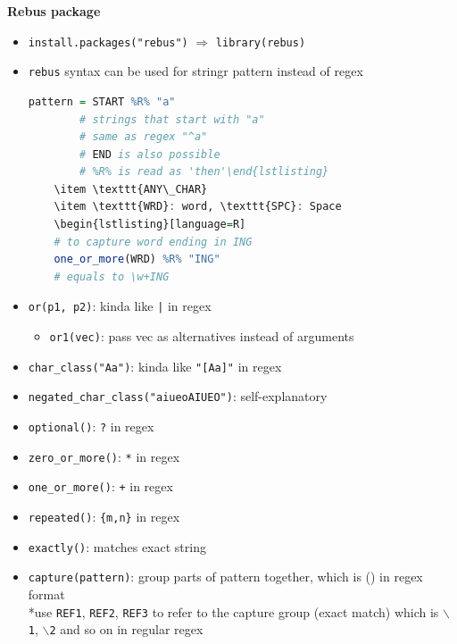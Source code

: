 \documentclass{article}
\begin{document}
\begin{multicols}{2}
\textbf{Rebus package}
\begin{itemize}
	\item \texttt{install.packages("rebus")} $\Rightarrow$ \texttt{library(rebus)}
	\item \texttt{rebus} syntax can be used for stringr pattern instead of regex
	\begin{lstlisting}[language =R]
		pattern = START %R% "a"
		# strings that start with "a"
		# same as regex "^a"
		# END is also possible
		# %R% is read as 'then'\end{lstlisting}
	\item \texttt{ANY\_CHAR}
	\item \texttt{WRD}: word, \texttt{SPC}: Space
	\begin{lstlisting}[language=R]
	# to capture word ending in ING
	one_or_more(WRD) %R% "ING"
	# equals to \w+ING
	\end{lstlisting}
	\item \texttt{or(p1, p2)}: kinda like \texttt{|} in regex
	\begin{itemize}
		\item \texttt{or1(vec)}: pass vec as alternatives instead of arguments
	\end{itemize}
	\item \texttt{char\_class("Aa")}: kinda like \texttt{"[Aa]"} in regex
	\item \texttt{negated\_char\_class("aiueoAIUEO")}: self-explanatory
	\item \texttt{optional()}: \texttt{?} in regex
	\item \texttt{zero\_or\_more()}: \texttt{*} in regex
	\item \texttt{one\_or\_more()}: \texttt{+} in regex
	\item \texttt{repeated()}: \texttt{\{m,n\}} in regex
	\item \texttt{exactly()}: matches exact string
	\item \texttt{capture(pattern)}: group parts of pattern together, which is () in regex format\\
	*use \texttt{REF1}, \texttt{REF2}, \texttt{REF3} to refer to the capture group (exact match) which is \texttt{$\backslash$1}, \texttt{$\backslash$2} and so on in regular regex


\end{itemize}
\end{multicols}
\end{document}
